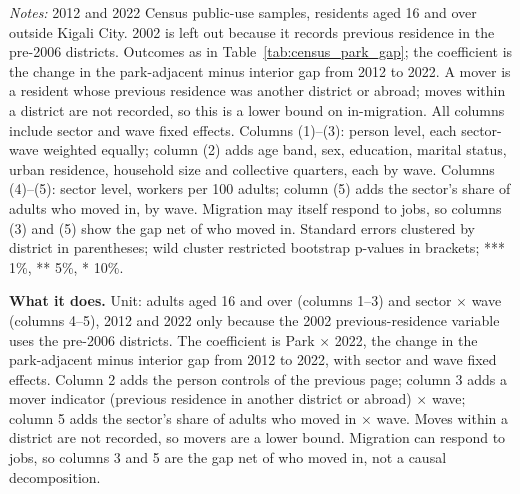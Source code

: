 \documentclass[11pt]{article}
\begin{document}
\begin{table}[H]
\begin{minipage}{0.95\textwidth}
\textit{Notes:} 2012 and 2022 Census public-use samples, residents aged 16 and over outside Kigali City. 2002 is left out because it records previous residence in the pre-2006 districts. Outcomes as in Table~\ref{tab:census_park_gap}; the coefficient is the change in the park-adjacent minus interior gap from 2012 to 2022. A mover is a resident whose previous residence was another district or abroad; moves within a district are not recorded, so this is a lower bound on in-migration. All columns include sector and wave fixed effects. Columns (1)--(3): person level, each sector-wave weighted equally; column (2) adds age band, sex, education, marital status, urban residence, household size and collective quarters, each by wave. Columns (4)--(5): sector level, workers per 100 adults; column (5) adds the sector's share of adults who moved in, by wave. Migration may itself respond to jobs, so columns (3) and (5) show the gap net of who moved in. Standard errors clustered by district in parentheses; wild cluster restricted bootstrap p-values in brackets; *** 1\%, ** 5\%, * 10\%.
\end{minipage}
\end{table}

\textbf{What it does.} Unit: adults aged 16 and over (columns 1--3) and sector $\times$ wave (columns 4--5), 2012 and 2022 only because the 2002 previous-residence variable uses the pre-2006 districts. The coefficient is Park $\times$ 2022, the change in the park-adjacent minus interior gap from 2012 to 2022, with sector and wave fixed effects. Column 2 adds the person controls of the previous page; column 3 adds a mover indicator (previous residence in another district or abroad) $\times$ wave; column 5 adds the sector's share of adults who moved in $\times$ wave. Moves within a district are not recorded, so movers are a lower bound. Migration can respond to jobs, so columns 3 and 5 are the gap net of who moved in, not a causal decomposition.
\end{document}

